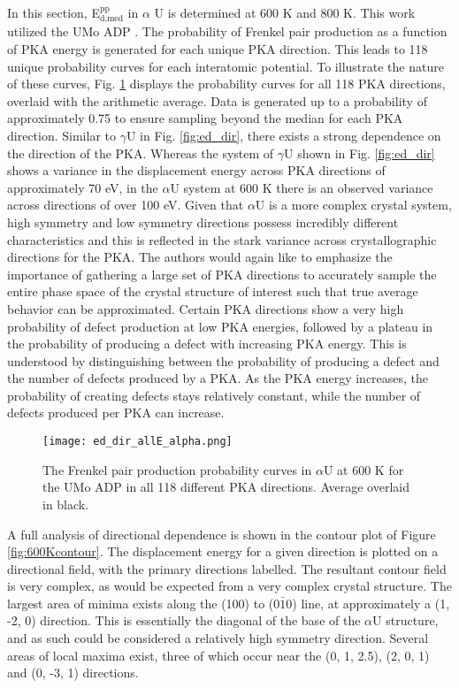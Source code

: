 \documentclass[review]{elsarticle}
\begin{document}
In this section, E$^{\textrm{pp}}_{\textrm{d,med}}$ in $\alpha$ U is determined at 600 K and 800 K. This work utilized the UMo ADP \cite{smirnovaADP}. The probability of Frenkel pair production as a function of PKA energy is generated for each unique PKA direction. This leads to 118 unique probability curves for each interatomic potential. To illustrate the nature of these curves, Fig. \ref{fig:ed_diralpha} displays the probability curves for all 118 PKA directions, overlaid with the arithmetic average. Data is generated up to a probability of approximately 0.75 to ensure sampling beyond the median for each PKA direction. Similar to $\gamma$U in Fig. \ref{fig:ed_dir}, there exists a strong dependence on the direction of the PKA. Whereas the system of $\gamma$U shown in Fig. \ref{fig:ed_dir} shows a variance in the displacement energy across PKA directions of approximately 70 eV, in the $\alpha$U system at 600 K there is an observed variance across directions of over 100 eV. Given that $\alpha$U is a more complex crystal system, high symmetry and low symmetry directions possess incredibly different characteristics and this is reflected in the stark variance across crystallographic directions for the PKA. The authors would again like to emphasize the importance of gathering a large set of PKA directions to accurately sample the entire phase space of the crystal structure of interest such that true average behavior can be approximated. Certain PKA directions show a very high probability of defect production at low PKA energies, followed by a plateau in the probability of producing a defect with increasing PKA energy. This is understood by distinguishing between the probability of producing a defect and the number of defects produced by a PKA. As the PKA energy increases, the probability of creating defects stays relatively constant, while the number of defects produced per PKA can increase. 

\begin{figure}[h]
 \centering
 \texttt{[image: ed\_dir\_allE\_alpha.png]} 
 \caption{The Frenkel pair production probability curves in $\alpha$U at 600 K for the UMo ADP in all 118 different PKA directions. Average overlaid in black.}
 \label{fig:ed_diralpha}
\end{figure}

\FloatBarrier

A full analysis of directional dependence is shown in the contour plot of Figure \ref{fig:600Kcontour}. The displacement energy for a given direction is plotted on a directional field, with the primary directions labelled. The resultant contour field is very complex, as would be expected from a very complex crystal structure. The largest area of minima exists along the (100) to (0$\bar{1}$0) line, at approximately a (1, -2, 0) direction. This is essentially the diagonal of the base of the $\alpha$U structure, and as such could be considered a relatively high symmetry direction. Several areas of local maxima exist, three of which occur near the (0, 1, 2.5), (2, 0, 1) and (0, -3, 1) directions. 
\end{document}
